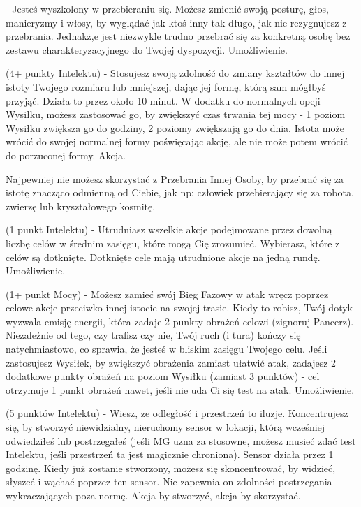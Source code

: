 { - Jesteś wyszkolony w przebieraniu się. Możesz zmienić swoją posturę, głos, manieryzmy i włosy, by wyglądać jak ktoś inny tak długo, jak nie rezygnujesz z przebrania. Jednakż,e jest niezwykle trudno przebrać się za konkretną osobę bez zestawu charakteryzacyjnego do Twojej dyspozycji. Umożliwienie. 

 (4+ punkty Intelektu) - Stosujesz swoją zdolność do zmiany kształtów do innej istoty Twojego rozmiaru lub mniejszej, dając jej formę, którą sam mógłbyś przyjąć. Działa to przez około 10 minut. W dodatku do normalnych opcji Wysiłku, możesz zastosować go, by zwiększyć czas trwania tej mocy - 1 poziom Wysiłku zwiększa go do godziny, 2 poziomy zwiększają go do dnia. Istota może wrócić do swojej normalnej formy poświęcając akcję, ale nie może potem wrócić do porzuconej formy. Akcja.

Najpewniej nie możesz skorzystać z Przebrania Innej Osoby, by przebrać się za istotę znacząco odmienną od Ciebie, jak np: człowiek przebierający się za robota, zwierzę lub kryształowego kosmitę. 

 (1 punkt Intelektu) - Utrudniasz wszelkie akcje podejmowane przez dowolną liczbę celów w średnim zasięgu, które mogą Cię zrozumieć. Wybierasz, które z celów są dotknięte. Dotknięte cele mają utrudnione akcje na jedną rundę. Umożliwienie. 

 (1+ punkt Mocy) - Możesz zamieć swój Bieg Fazowy w atak wręcz poprzez celowe akcje przeciwko innej istocie na swojej trasie. Kiedy to robisz, Twój dotyk wyzwala emisję energii, która zadaje 2 punkty obrażeń celowi (zignoruj Pancerz). Niezależnie od tego, czy trafisz czy nie, Twój ruch (i tura) kończy się natychmiastowo, co sprawia, że jesteś w bliskim zasięgu Twojego celu. Jeśli zastosujesz Wysiłek, by zwiększyć obrażenia zamiast ułatwić atak, zadajesz 2 dodatkowe punkty obrażeń na poziom Wysiłku (zamiast 3 punktów) - cel otrzymuje 1 punkt obrażeń nawet, jeśli nie uda Ci się test na atak. Umożliwienie.

 (5 punktów Intelektu) - Wiesz, ze odległość i przestrzeń to iluzje. Koncentrujesz się, by stworzyć niewidzialny, nieruchomy sensor w lokacji, którą wcześniej odwiedziłeś lub postrzegałeś (jeśli MG uzna za stosowne, możesz musieć zdać test Intelektu, jeśli przestrzeń ta jest magicznie chroniona). Sensor działa przez 1 godzinę. Kiedy już zostanie stworzony, możesz się skoncentrować, by widzieć, słyszeć i wąchać poprzez ten sensor. Nie zapewnia on zdolności postrzegania wykraczających poza normę. Akcja by stworzyć, akcja by skorzystać. 

}
